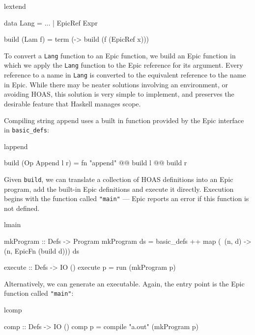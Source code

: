 \begin{SaveVerbatim}{lextend}

data Lang = ...
          | EpicRef Expr

build (Lam f) = term (\x -> build (f (EpicRef x)))

\end{SaveVerbatim}

\noindent
To convert a \texttt{Lang} function to an Epic function, we build an
Epic function in which we apply the \texttt{Lang} function to the Epic
reference for its argument. Every reference to a name in \texttt{Lang}
is converted to the equivalent reference to the name in Epic. While
there may be neater solutions involving an environment, or avoiding
HOAS, this solution is very simple to implement, and preserves the
desirable feature that Haskell manages scope.

Compiling string append uses a built in function provided by the Epic
interface in \texttt{basic\_defs}:

\begin{SaveVerbatim}{lappend}

build (Op Append l r) 
       = fn "append" @@ build l @@ build r

\end{SaveVerbatim}

\noindent
Given \texttt{build}, we can translate a collection of HOAS
definitions into an Epic program, add the built-in Epic definitions
and execute it directly. Execution begins with the function called
\texttt{"main"} --- Epic reports an error if this function is not
defined.

\begin{SaveVerbatim}{lmain}

mkProgram :: Defs -> Program
mkProgram ds = basic_defs ++ 
               map (\ (n, d) -> 
                      (n, EpicFn (build d))) ds

execute :: Defs -> IO ()
execute p = run (mkProgram p)

\end{SaveVerbatim}

\noindent
Alternatively, we can generate an executable. Again, the entry point
is the Epic function called \texttt{"main"}:

\begin{SaveVerbatim}{lcomp}

comp :: Defs -> IO ()
comp p = compile "a.out" (mkProgram p)

\end{SaveVerbatim}

